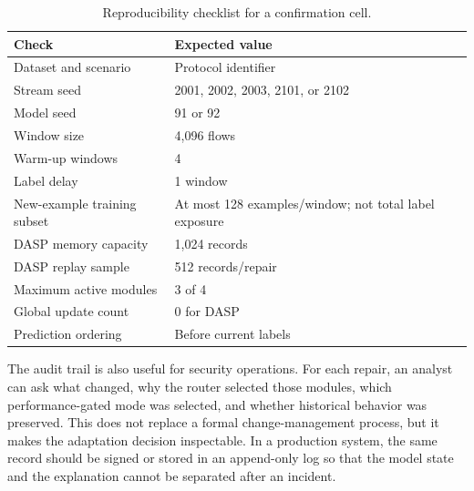 \begin{table}[t]
\caption{Reproducibility checklist for a confirmation cell.}
\label{tab:repro-checklist}
\centering
\scriptsize
\begin{tabular}{p{}p{}}
\toprule
Check & Expected value\\
\midrule
Dataset and scenario & Protocol identifier\\
Stream seed & 2001, 2002, 2003, 2101, or 2102\\
Model seed & 91 or 92\\
Window size & 4,096 flows\\
Warm-up windows & 4\\
Label delay & 1 window\\
New-example training subset & At most 128 examples/window; not total label exposure\\
DASP memory capacity & 1,024 records\\
DASP replay sample & 512 records/repair\\
Maximum active modules & 3 of 4\\
Global update count & 0 for DASP\\
Prediction ordering & Before current labels\\
\bottomrule
\end{tabular}
\end{table}

The audit trail is also useful for security operations. For each repair, an analyst can ask what changed, why the router selected those modules, which performance-gated mode was selected, and whether historical behavior was preserved. This does not replace a formal change-management process, but it makes the adaptation decision inspectable. In a production system, the same record should be signed or stored in an append-only log so that the model state and the explanation cannot be separated after an incident.




